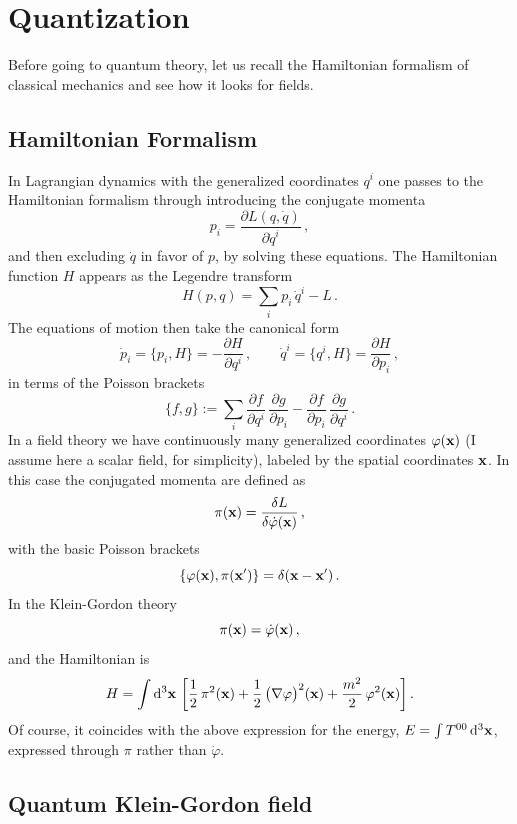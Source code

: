 \section{Quantization}

Before going to quantum theory, let us recall the Hamiltonian formalism of
classical mechanics and see how it looks for fields.

\subsection*{Hamiltonian Formalism}

In Lagrangian dynamics with the generalized coordinates $q^i$ one passes to
the Hamiltonian formalism through introducing the conjugate momenta
\[
p_i=\frac{\partial L(q,\dot q)}{\partial\dot q^i}\,,
\]
and then excluding $\dot q$ in favor of $p$, by solving these equations. The
Hamiltonian function $H$ appears as the Legendre transform
\[
H(p,q)=\sum_i p_i\,\dot q^i-L\,.
\]
The equations of motion then take the canonical form
\[
\dot p_i=\{p_i,H\}=-\frac{\partial H}{\partial q^i}\,,\qquad
\dot q^i=\{q^i,H\}=\frac{\partial H}{\partial p_i}\,,
\]
in terms of the Poisson brackets
\[
\{f,g\}:=\sum_i\frac{\partial f}{\partial q^i}\,\frac{\partial g}{\partial p_i}-\frac{\partial f}{\partial p_i}\,\frac{\partial g}{\partial q^i}\,.
\]
In a field theory we have continuously many generalized coordinates
$\varphi(\mathbf{x})$ (I assume here a scalar field, for simplicity), labeled by the
spatial coordinates $\mathbf{x}$. In this case the conjugated momenta are defined as
\[
\pi(\mathbf{x})=\frac{\delta L}{\delta\dot\varphi(\mathbf{x})}\,,
\]
with the basic Poisson brackets
\[
\{\varphi(\mathbf{x}),\pi(\mathbf{x}')\}=\delta(\mathbf{x}-\mathbf{x}')\,.
\]
In the Klein-Gordon theory
\[
\pi(\mathbf{x})=\dot\varphi(\mathbf{x})\,,
\]
and the Hamiltonian is
\begin{equation}\label{eq:HKG}
H=\int \mathop{}\!\mathrm{d}^3\mathbf{x}\,\left[\frac12\,\pi^2(\mathbf{x})+\frac12\,\bigl(\nabla\varphi\bigr)^2(\mathbf{x})+\frac{m^2}{2}\,\varphi^2(\mathbf{x})\right].
\end{equation}
Of course, it coincides with the above expression for the energy,
$E=\int T^{00}\mathop{}\!\mathrm{d}^3\mathbf{x}$, expressed through $\pi$ rather than $\dot\varphi$.

\subsection*{Quantum Klein-Gordon field}

